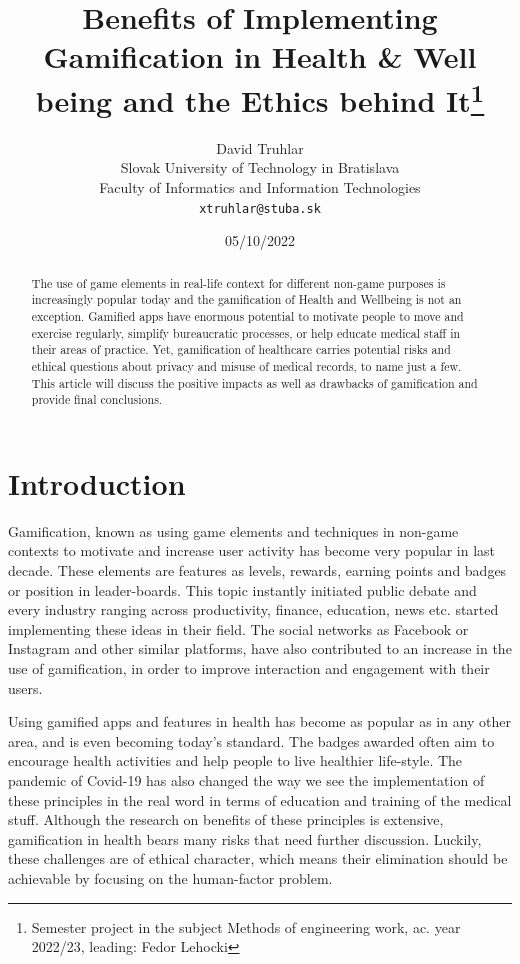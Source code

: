 \documentclass[10pt,twoside,english,a4paper]{article}
\title{Benefits of Implementing Gamification in Health \& Well being and the Ethics behind It\thanks{Semester project in the subject Methods of engineering work, ac. year 2022/23, leading: Fedor Lehocki}} %
\author{David Truhlar\\[2pt]
	{\small Slovak University of Technology in Bratislava}\\
	{\small Faculty of Informatics and Information Technologies}\\
	{\small \texttt{xtruhlar@stuba.sk}}
	}
\date{\small 05/10/2022} %
\begin{document}
\maketitle

\begin{abstract}
The use of game elements in real-life context for different non-game purposes is increasingly popular today and the gamification of Health and Wellbeing is not an exception. Gamified apps have enormous potential to motivate people to move and exercise regularly, simplify bureaucratic processes, or help educate medical staff in their areas of practice. Yet, gamification of healthcare carries potential risks and ethical questions about privacy and misuse of medical records, to name just a few. This article will discuss the positive impacts as well as drawbacks of gamification and provide final conclusions.
\end{abstract}

%
%
%

\section*{Introduction}
Gamification, known as using game elements and techniques  in non-game contexts to motivate and increase user activity \cite{Gamefulness} has become very popular in last decade. These elements are features as levels, rewards, earning points and badges or position in leader-boards. This topic instantly initiated public debate and every industry ranging across productivity, finance, education, news etc. \cite{Gamefulness} started implementing these ideas in their field. The social networks as Facebook or Instagram and other similar platforms, have also contributed to an increase in the use of gamification, in order to improve interaction and engagement with their users. 

Using gamified apps and features in health  has become as popular as  in any other area, and is even becoming today's standard. The badges awarded often aim to encourage health activities and help people to live healthier life-style. The pandemic of Covid-19 has also changed the way we see the implementation of these principles in the real word in terms of education and training of the medical stuff.  Although the research on benefits of these principles is extensive, gamification in health bears many risks that need further discussion. Luckily, these challenges are of ethical character, which means their elimination should be achievable by focusing on the human-factor problem.
\end{document}
